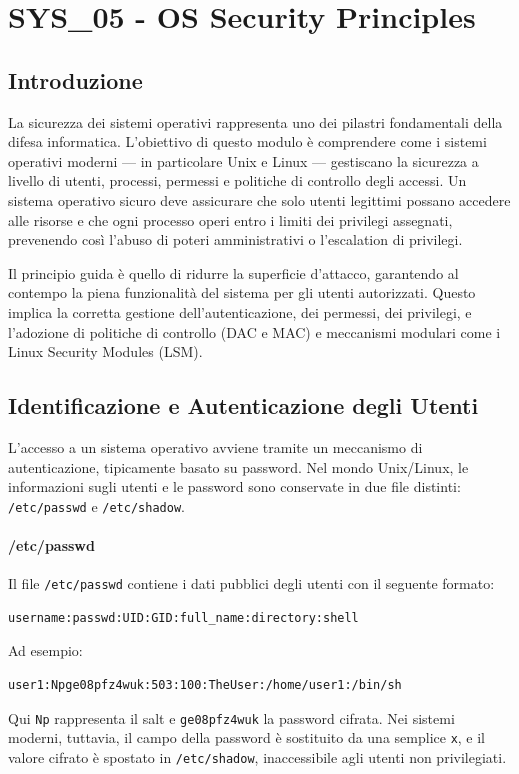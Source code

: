\newpage

\section{SYS\_05 - OS Security Principles}

\subsection{Introduzione}
La sicurezza dei sistemi operativi rappresenta uno dei pilastri fondamentali della difesa informatica.
L’obiettivo di questo modulo è comprendere come i sistemi operativi moderni — in particolare Unix e Linux — gestiscano la sicurezza a livello di utenti, processi, permessi e politiche di controllo degli accessi.
Un sistema operativo sicuro deve assicurare che solo utenti legittimi possano accedere alle risorse e che ogni processo operi entro i limiti dei privilegi assegnati, prevenendo così l’abuso di poteri amministrativi o l’escalation di privilegi.

Il principio guida è quello di ridurre la superficie d’attacco, garantendo al contempo la piena funzionalità del sistema per gli utenti autorizzati.
Questo implica la corretta gestione dell’autenticazione, dei permessi, dei privilegi, e l’adozione di politiche di controllo (DAC e MAC) e meccanismi modulari come i Linux Security Modules (LSM).

\subsection{Identificazione e Autenticazione degli Utenti}
L’accesso a un sistema operativo avviene tramite un meccanismo di autenticazione, tipicamente basato su password.
Nel mondo Unix/Linux, le informazioni sugli utenti e le password sono conservate in due file distinti: \texttt{/etc/passwd} e \texttt{/etc/shadow}.

\paragraph{/etc/passwd}
Il file \texttt{/etc/passwd} contiene i dati pubblici degli utenti con il seguente formato:
\begin{verbatim}
username:passwd:UID:GID:full_name:directory:shell
\end{verbatim}
Ad esempio:
\begin{verbatim}
user1:Npge08pfz4wuk:503:100:TheUser:/home/user1:/bin/sh
\end{verbatim}
Qui \texttt{Np} rappresenta il salt e \texttt{ge08pfz4wuk} la password cifrata.
Nei sistemi moderni, tuttavia, il campo della password è sostituito da una semplice \texttt{x}, e il valore cifrato è spostato in \texttt{/etc/shadow}, inaccessibile agli utenti non privilegiati.


